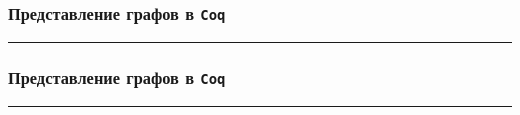 \documentclass[14pt]{beamer}
\begin{document}
\begin{frame}[fragile]
\frametitle{Представление графов в {\tt Coq}}
\begin{figure}[h]
  \begin{minipage}[h]{1\linewidth}
  \end{minipage}
\end{figure}
\hrule
\begin{figure}[h]
  \begin{minipage}[h]{1\linewidth}
  \end{minipage}
\end{figure}

\end{frame}

\begin{frame}[fragile]
\frametitle{Представление графов в {\tt Coq}}
\begin{figure}[h]
  \begin{minipage}[h]{1\linewidth}
  \end{minipage}
\end{figure}
\hrule
\begin{figure}[h]
  \begin{minipage}[h]{1\linewidth}
  \end{minipage}
\end{figure}

\end{frame}
\end{document}
